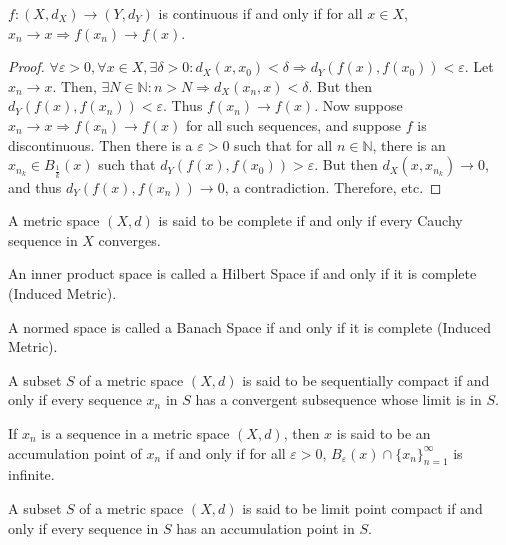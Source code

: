 \documentclass[crop=false,class=book,oneside]{standalone}
\begin{document}
            \begin{theorem}
            $f:(X,d_X)\rightarrow (Y,d_Y)$ is continuous if and only if for all $x\in X$, $x_n\rightarrow x \Rightarrow f(x_n)\rightarrow f(x)$.
            \end{theorem}
            \begin{proof}
            $\forall \varepsilon>0,\forall x\in X,\exists \delta>0:d_X(x,x_0)<\delta \Rightarrow d_Y(f(x),f(x_0))<\varepsilon$. Let $x_n \rightarrow x$. Then, $\exists N\in \mathbb{N}:n>N \Rightarrow d_X(x_n,x)<\delta$. But then $d_Y(f(x),f(x_n)) < \varepsilon$. Thus $f(x_n)\rightarrow f(x)$. Now suppose $x_n\rightarrow x \Rightarrow f(x_n)\rightarrow f(x)$ for all such sequences, and suppose $f$ is discontinuous. Then there is a $\varepsilon>0$ such that for all $n\in \mathbb{N}$, there is an $x_{n_k} \in B_{\frac{1}{k}}(x)$ such that $d_Y(f(x),f(x_0))>\varepsilon$. But then $d_X(x,x_{n_k})\rightarrow 0$, and thus $d_Y(f(x),f(x_n))\rightarrow 0$, a contradiction. Therefore, etc.
            \end{proof}
            \begin{definition}
            A metric space $(X,d)$ is said to be complete if and only if every Cauchy sequence in $X$ converges.
            \end{definition}
            \begin{definition}
            An inner product space is called a Hilbert Space if and only if it is complete (Induced Metric).
            \end{definition}
            \begin{definition}
            A normed space is called a Banach Space if and only if it is complete (Induced Metric).
            \end{definition}
            \begin{definition}
            A subset $S$ of a metric space $(X,d)$ is said to be sequentially compact if and only if every sequence $x_n$ in $S$ has a convergent subsequence whose limit is in $S$.
            \end{definition}
            \begin{definition}
            If $x_n$ is a sequence in a metric space $(X,d)$, then $x$ is said to be an accumulation point of $x_n$ if and only if for all $\varepsilon>0$, $B_{\varepsilon}(x)\cap \{x_n\}_{n=1}^{\infty}$ is infinite.
            \end{definition}
            \begin{definition}
            A subset $S$ of a metric space $(X,d)$ is said to be limit point compact if and only if every sequence in $S$ has an accumulation point in $S$.
            \end{definition}
\end{document}
